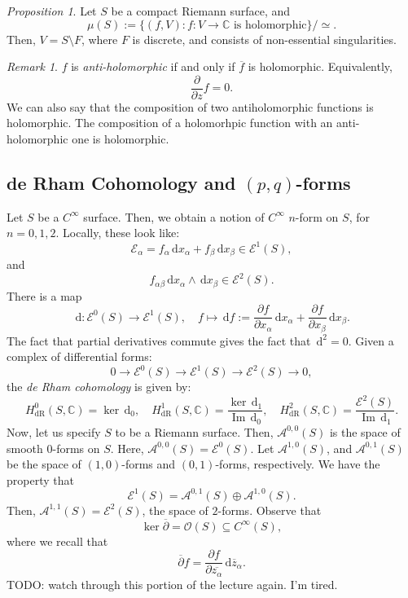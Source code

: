 \documentclass[a4paper]{report}
\theoremstyle{definition}
\theoremstyle{remark}
\newtheorem{remark}{Remark}
\theoremstyle{proposition}
\newtheorem{proposition}{Proposition}
\theoremstyle{conjecture}
\theoremstyle{lemma}
\theoremstyle{corollary}
\theoremstyle{exercise}
\theoremstyle{example}
\newcommand{\C}{\mathbb{C}}
\newcommand{\mcal}{\mathcal}
\newcommand{\diff}{\,\mathrm{d}}
\newcommand{\on}{\operatorname}
\begin{document}
\begin{proposition}
    Let $S$ be a compact Riemann surface, and 
    $$\mu(S) := \lbrace (f,V) :\text{$f : V \to \C$ is holomorphic}\rbrace/\simeq.$$
    Then, $V = S\setminus F$, where $F$ is discrete, and consists of 
    non-essential singularities. 
\end{proposition}

\begin{remark}
    $f$ is \emph{anti-holomorphic} if and only if $\overline{f}$ is
    holomorphic. Equivalently, 
    $$\frac{\partial}{\partial z}f = 0.$$ 
    We can also say that the composition of two antiholomorphic functions 
    is holomorphic. The composition of a holomorhpic function with 
    an anti-holomorphic one is holomorphic.
\end{remark}

\subsection{de Rham Cohomology and $(p,q)$-forms}

Let $S$ be a $C^\infty$ surface. Then, we obtain a notion of $C^\infty$
$n$-form on $S$, for $n=0,1,2$. Locally, these look like:
$$\mcal{E}_\alpha = f_\alpha \diff x_\alpha + f_\beta\diff x_\beta \in \mcal{E}^1(S),$$
and $$f_{\alpha\beta}\diff x_\alpha \wedge \diff x_\beta \in \mcal{E}^2(S).$$
There is a map 
$$\diff : \mcal{E}^0(S) \longrightarrow \mcal{E}^1(S), \quad f \longmapsto \diff f := \frac{\partial f}{\partial x_\alpha}\diff x_\alpha + \frac{\partial f}{\partial x_\beta}\diff x_\beta.$$
The fact that partial derivatives commute gives the fact that 
$\diff^2 = 0$.
Given a complex of differential forms:
$$0 \longrightarrow \mcal{E}^0(S) \longrightarrow \mcal{E}^1(S) \longrightarrow \mcal{E}^2(S) \longrightarrow 0,$$
the \emph{de Rham cohomology} is given by:
$$H_{\on{dR}}^0(S,\C) = \ker \diff_0,\quad H^1_{\on{dR}}(S,\C) = \frac{\ker \diff_1}{\on{Im} \diff_0}, \quad H^2_{\on{dR}}(S,\C) = \frac{\mcal{E}^2(S)}{\on{Im}\diff_1}.$$
Now, let us specify $S$ to be a Riemann surface. 
Then, $\mcal{A}^{0,0}(S)$ is the space of smooth $0$-forms on $S$.
Here, $\mcal{A}^{0,0}(S) = \mcal{E}^0(S)$. Let $\mcal{A}^{1,0}(S)$, and 
$\mcal{A}^{0,1}(S)$ be the space of $(1,0)$-forms and $(0,1)$-forms, respectively.
We have the property that $$\mcal{E}^1(S) = \mcal{A}^{0,1}(S)\oplus \mcal{A}^{1,0}(S).$$
Then, $\mcal{A}^{1,1}(S) = \mcal{E}^2(S)$, the space of $2$-forms. 
Observe that $$\ker\overline{\partial} = \mcal{O}(S) \subseteq C^\infty(S),$$
where we recall that $$\overline{\partial} f = \frac{\partial f}{\partial \overline{z_\alpha}} \diff \overline{z}_\alpha.$$
TODO: watch through this portion of the lecture again. I'm tired.
\end{document}
